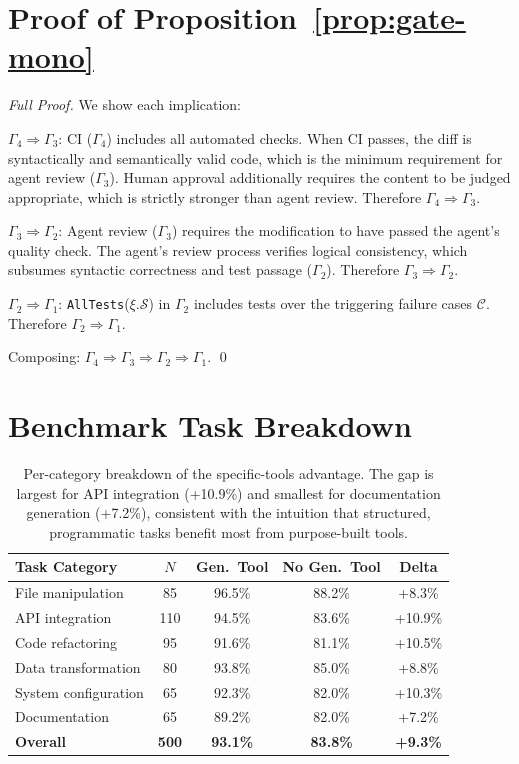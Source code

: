 \documentclass[11pt]{article}
\begin{document}
\section{Proof of Proposition~\ref{prop:gate-mono}}
\label{app:proof-gate}

\begin{proof}[Full Proof]
We show each implication:

$\Gamma_4 \Rightarrow \Gamma_3$: CI ($\Gamma_4$) includes all automated checks.
When CI passes, the diff is syntactically and semantically valid code, which is
the minimum requirement for agent review ($\Gamma_3$). Human approval additionally
requires the content to be judged appropriate, which is strictly stronger than
agent review. Therefore $\Gamma_4 \Rightarrow \Gamma_3$.

$\Gamma_3 \Rightarrow \Gamma_2$: Agent review ($\Gamma_3$) requires the
modification to have passed the agent's quality check. The agent's review
process verifies logical consistency, which subsumes syntactic correctness and
test passage ($\Gamma_2$). Therefore $\Gamma_3 \Rightarrow \Gamma_2$.

$\Gamma_2 \Rightarrow \Gamma_1$: \texttt{AllTests}($\xi.\mathcal{S}$) in
$\Gamma_2$ includes tests over the triggering failure cases $\mathcal{C}$.
Therefore $\Gamma_2 \Rightarrow \Gamma_1$.

Composing: $\Gamma_4 \Rightarrow \Gamma_3 \Rightarrow \Gamma_2 \Rightarrow \Gamma_1$. \qed
\end{proof}

\section{Benchmark Task Breakdown}
\label{app:benchmark}

\begin{table}[H]
\centering
\begin{tabular}{lcccc}
\toprule
Task Category & $N$ & Gen.\ Tool & No Gen.\ Tool & Delta \\
\midrule
File manipulation & 85 & 96.5\% & 88.2\% & +8.3\% \\
API integration & 110 & 94.5\% & 83.6\% & +10.9\% \\
Code refactoring & 95 & 91.6\% & 81.1\% & +10.5\% \\
Data transformation & 80 & 93.8\% & 85.0\% & +8.8\% \\
System configuration & 65 & 92.3\% & 82.0\% & +10.3\% \\
Documentation & 65 & 89.2\% & 82.0\% & +7.2\% \\
\midrule
\textbf{Overall} & \textbf{500} & \textbf{93.1\%} & \textbf{83.8\%} & \textbf{+9.3\%} \\
\bottomrule
\end{tabular}
\caption{Per-category breakdown of the specific-tools advantage.
The gap is largest for API integration (+10.9\%) and smallest for
documentation generation (+7.2\%), consistent with the intuition
that structured, programmatic tasks benefit most from purpose-built
tools.}
\label{tab:breakdown}
\end{table}
\end{document}
